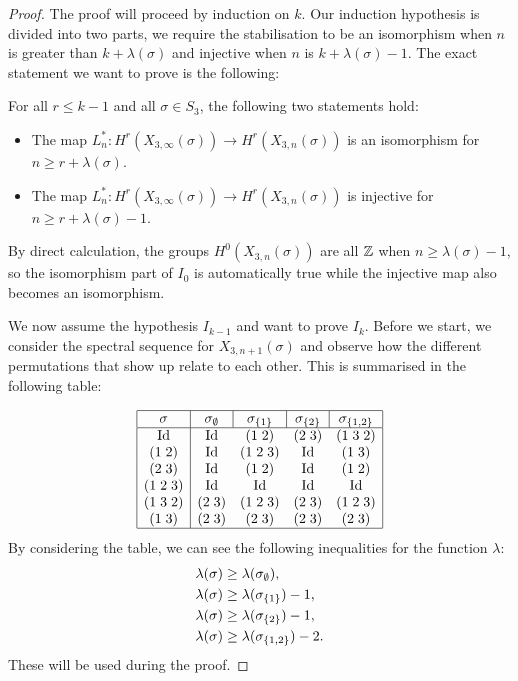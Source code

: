 \begin{proof}
  The proof will proceed by induction on $k$. Our induction hypothesis
  is divided into two parts, we require the stabilisation to be an
  isomorphism when $n$ is greater than $k+\lambda(\sigma)$ and
  injective when $n$ is $k+\lambda(\sigma)-1$. The exact statement we
  want to prove is the following:
  \begin{hypothesis}[$I_{k-1}$]
    For all $r \leq k-1$ and all $\sigma \in S_3$, the following two
    statements hold:
    \begin{itemize}
    \item The map $L_{n}^* : H^r(X_{3,\infty}(\sigma)) \to
      H^r(X_{3,n}(\sigma))$ is an isomorphism for $n \geq r +
      \lambda(\sigma)$.
    \item The map $L_{n}^* : H^r(X_{3,\infty}(\sigma)) \to
      H^r(X_{3,n}(\sigma))$ is injective for $n \geq r +\lambda(\sigma)
      -1$.
    \end{itemize}
  \end{hypothesis}
  
  By direct calculation, the
  groups $H^0(X_{3,n}(\sigma))$ are all $\mathbb{Z}$ when $n \geq
  \lambda(\sigma)-1$, so the isomorphism part of $I_0$ is
  automatically true while the injective map also becomes an
  isomorphism.
  
  We now assume the hypothesis $I_{k-1}$ and want to prove $I_k$. Before
  we start, we consider the spectral sequence for $X_{3,n+1}(\sigma)$
  and observe how the different permutations that show up relate to each
  other. This is summarised in the following table:
  
  \[
  \begin{array}{|c|cccc|}
    \hline
    \sigma & \multicolumn{1}{c|}{\sigma_\emptyset} 
    & \multicolumn{1}{c|}{\sigma_{\set{1}}} 
    & \multicolumn{1}{c|}{\sigma_{\set{2}}} & \sigma_{\set{1,2}} \\
    \hline
    \Id & \Id & (1\;2) & (2\;3) & (1\;3\;2) \\
    (1\;2) & \Id & (1\;2\;3) & \Id & (1\;3) \\
    (2\;3) & \Id & (1\;2) & \Id & (1\;2) \\
    (1\;2\;3) & \Id & \Id & \Id & \Id \\
    (1\;3\;2) & (2\;3) & (1\;2\;3) & (2\;3) & (1\;2\;3) \\
    (1\;3) & (2\; 3) & (2\;3) & (2\;3) & (2\;3) \\
    \hline
  \end{array}
  \]
  By considering the table, we can see the following inequalities for
  the function $\lambda$:
  \begin{align*}
    \lambda(\sigma) &\geq \lambda(\sigma_{\emptyset}), \\
    \lambda(\sigma) &\geq \lambda(\sigma_{\left\{ 1 \right\}}) - 1, \\
    \lambda(\sigma) &\geq \lambda(\sigma_{\left\{ 2 \right\}}) - 1, \\
    \lambda(\sigma) &\geq \lambda(\sigma_{\left\{ 1,2 \right\}}) - 2. \\
  \end{align*}
  These will be used during the proof.
  

\end{proof}
